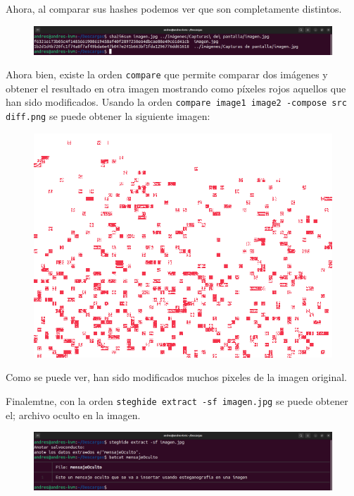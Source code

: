\documentclass{article}
\begin{document}
Ahora, al comparar sus hashes podemos ver que son completamente distintos.

\begin{figure}[H]
    \includegraphics[width=\textwidth]{imagenes/Captura desde 2022-10-30 11-38-52.png}
\end{figure}

Ahora bien, existe la orden \verb|compare| que permite comparar dos imágenes y obtener el resultado en otra imagen mostrando como píxeles rojos aquellos que han sido modificados. Usando la orden \verb|compare image1 image2 -compose src diff.png| se puede obtener la siguiente imagen:

\begin{figure}[H]
    \includegraphics[width=\textwidth]{imagenes/diff.png}
\end{figure}

Como se puede ver, han sido modificados muchos pixeles de la imagen original.

Finalemtne, con la orden \verb|steghide extract -sf imagen.jpg| se puede obtener el; archivo oculto en la imagen.

\begin{figure}[H]
    \includegraphics[width=\textwidth]{imagenes/Captura desde 2022-10-30 11-44-23.png}
\end{figure}
\end{document}
